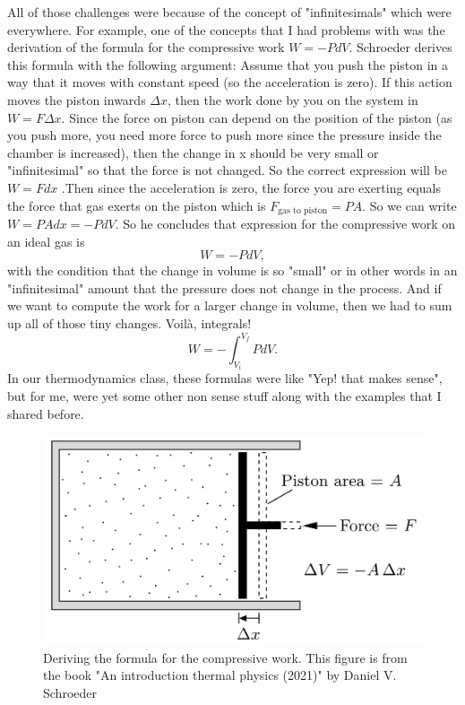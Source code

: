 \documentclass[11pt,a4paper]{article}
\begin{document}
All of those challenges were because of the concept of "infinitesimals" which were everywhere. For example, one of the concepts that I had problems with was the derivation of the formula for the compressive work $W = -P dV.$ Schroeder derives this formula with the following argument: Assume that you push the piston in a way that it moves with constant speed (so the acceleration is zero). If this action moves the piston inwards $\Delta x$, then the work done by you on the system in $W = F \Delta x$. Since the force on piston can depend on the position of the piston (as you push more, you need more force to push more since the pressure inside the chamber is increased), then the change in x should be very small or "infinitesimal" so that the force is not changed. So the correct expression will be $W = F dx$ .Then since the acceleration is zero, the force you are exerting equals the force that gas exerts on the piston which is $F_\text{gas to piston} = P A$. So we can write $W = P A dx = -P dV$. So he concludes that expression for the compressive work on an ideal gas is
\[ W = -P dV, \]
with the condition that the change in volume is so "small" or in other words in an "infinitesimal" amount that the pressure does not change in the process. And if we want to compute the work for a larger change in volume, then we had to sum up all of those tiny changes. Voilà, integrals!
\[ W = - \int_{V_i}^{V_f} P dV.\]
In our thermodynamics class, these formulas were like "Yep! that makes sense", but for me, were yet some other non sense stuff along with the examples that I shared before.
\begin{figure}[h!]
	\centering
	\includegraphics[scale=0.25]{images/piston}
	\caption{Deriving the formula for the compressive work. This figure is from the book "An introduction thermal physics (2021)" by Daniel V. Schroeder}
	\label{fig:piston}
\end{figure}
\end{document}

